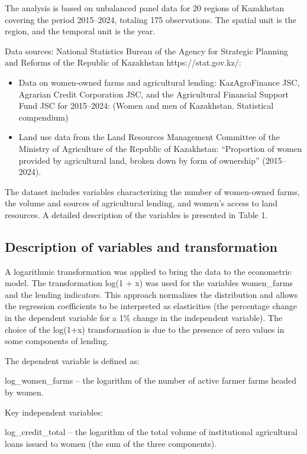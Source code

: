 ﻿\documentclass[pdflatex,sn-mathphys-ay]{sn-jnl}
\begin{document}
The analysis is based on unbalanced panel data for 20 regions of
Kazakhstan covering the period 2015--2024, totaling 175 observations.
The spatial unit is the region, and the temporal unit is the year.

Data sources: National Statistics Bureau of the Agency for Strategic
Planning and Reforms of the Republic of Kazakhstan https://stat.gov.kz/:

\begin{itemize}
\item Data on women-owned farms and agricultural lending: KazAgroFinance
JSC, Agrarian Credit Corporation JSC, and the Agricultural Financial
Support Fund JSC for 2015--2024: (Women and men of Kazakhstan.
Statistical compendium)
\item Land use data from the Land Resources Management Committee of the
Ministry of Agriculture of the Republic of Kazakhstan: ``Proportion of
women provided by agricultural land, broken down by form of ownership''
(2015--2024).
\end{itemize}

The dataset includes variables characterizing the number of women-owned
farms, the volume and sources of agricultural lending, and women's
access to land resources. A detailed description of the
variables is presented in Table 1.

\subsection{Description of variables and transformation}

A logarithmic transformation was applied to bring the data to the
econometric model. The transformation log(1 + x) was used for the
variables women\_farms and the lending indicators. This approach
normalizes the distribution and allows the regression coefficients to be
interpreted as elasticities (the percentage change in the dependent
variable for a 1\% change in the independent variable). The choice of
the log(1+x) transformation is due to the presence of zero values in
some components of lending.

The dependent variable is defined as:

log\_women\_farms -- the logarithm of the number of active farmer farms
headed by women.

Key independent variables:

log\_credit\_total -- the logarithm of the total volume of institutional
agricultural loans issued to women (the sum of the three components).
\end{document}
